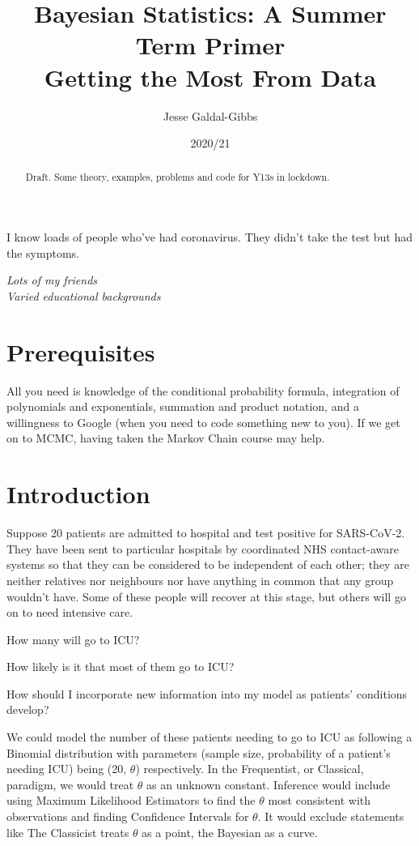 \documentclass{article}
\title{Bayesian Statistics: A Summer Term Primer \\
\large Getting the Most From Data}
\author{Jesse Galdal-Gibbs}
\date{2020/21}
\begin{document}
\maketitle

\begin{abstract} Draft.
Some theory, examples, problems and code for Y13s in lockdown.
\end{abstract}

\epigraph{I know loads of people who've had coronavirus. They didn't take the test but had the symptoms.}{\textit{Lots of my friends \\ Varied educational backgrounds}}

\section{Prerequisites}
All you need is knowledge of the conditional probability formula, integration of polynomials and exponentials, summation and product notation, and a willingness to Google (when you need to code something new to you). If we get on to MCMC, having taken the Markov Chain course may help.

\section{Introduction}

Suppose 20 patients are admitted to hospital and test positive for SARS-CoV-2. They have been sent to particular hospitals by coordinated NHS contact-aware systems so that they can be considered to be independent of each other; they are neither relatives nor neighbours nor have anything in common that any group wouldn't have. Some of these people will recover at this stage, but others will go on to need intensive care.

\begin{enumerate}[leftmargin=2cm,labelsep=0cm,align=left,label={[\arabic*]}]
    \item How many will go to ICU?
    \item How likely is it that most of them go to ICU?
    \item How should I incorporate new information into my model as patients' conditions develop?
\end{enumerate}

We could model the number of these patients needing to go to ICU as following a Binomial distribution with parameters (sample size, probability of a patient's needing ICU) being (20, $\theta$) respectively. In the Frequentist, or Classical, paradigm, we would treat $\theta$ as an unknown constant. Inference would include using Maximum Likelihood Estimators to find the $\theta$ most consistent with observations and finding Confidence Intervals for $\theta$. It would exclude statements like  The Classicist treats $\theta$ as a point, the Bayesian as a curve.
\end{document}
